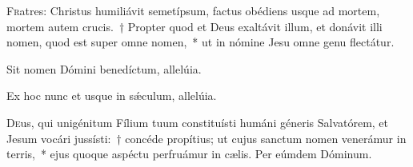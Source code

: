 \documentclass[vesperale_romanum.tex]{subfiles}
\begin{document}







\label{111_3a2}










\lettrine{F}{r}atres: Christus humiliávit semetípsum, factus obédiens usque ad mortem, mortem autem crucis.~† Propter quod et Deus exaltávit illum, et donávit illi nomen, quod est super omne nomen,~* ut in nómine Jesu omne genu flectátur.

\hymnus


\vv Sit nomen Dómini benedíctum, allelúia.

\rr Ex hoc nunc et usque in sǽculum, allelúia.

\admagnificat


\oratio

\lettrine{D}{e}us, qui unigénitum Fílium tuum constituísti humáni géneris Salvatórem, et Jesum vocári jussísti:~† concéde propítius; ut cujus sanctum nomen venerámur in terris,~* ejus quoque aspéctu perfruámur in cælis. Per eúmdem Dóminum.


\end{document}
